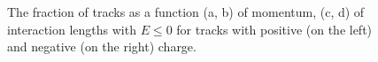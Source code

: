 \begin{figure}[htbp]
\centering
{}
~
\\
~
\caption{The fraction of tracks as a function (a, b) of momentum, (c, d) of interaction lengths with $E \leq 0$ for tracks with positive (on the left) and negative (on the right) charge.}
\label{fig:zerofracincl}
\end{figure}


